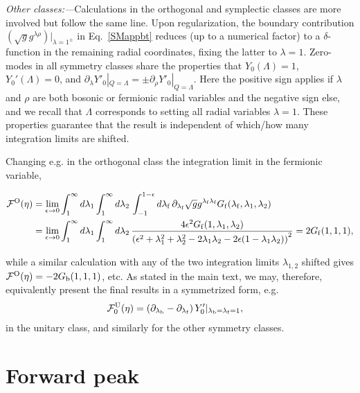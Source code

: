 \documentclass[twocolumn,showpacs,aps,prl]{revtex4}
\begin{document}
{\it Other classes:---}Calculations in the orthogonal and symplectic classes are more involved but follow 
the same line. Upon regularization, the boundary contribution $(\sqrt{g}g^{\lambda\rho})|_{\lambda=1^\pm}$
in Eq.~\eqref{SMappbt} reduces (up to a numerical factor) to a $\delta$-function in the remaining 
radial coordinates, fixing the latter to $\lambda=1$.
Zero-modes in all symmetry classes share the properties that   
$Y_0(\Lambda)=1$, $Y_0'(\Lambda)=0$,  and
$\partial_{\lambda}Y'_0|_{Q=\Lambda}=\pm \partial_{\rho}Y'_0|_{Q=\Lambda}$.
Here the positive sign applies if $\lambda$ and $\rho$ are both bosonic or fermionic
radial variables and the negative sign else, and we recall that $\Lambda$ corresponds  
to setting all radial variables $\lambda=1$.  These 
properties guarantee that the result is independent of which/how many integration limits are shifted.  

Changing e.g. in the orthogonal class 
the integration limit in the fermionic variable,
\begin{widetext}
\begin{align}
{\cal F}^{\rm O}(\eta)
&=
\lim_{\epsilon\to0}
\int_1^\infty d\lambda_1
\int_1^\infty d\lambda_2\,
\int_{-1}^{1-\epsilon} d\lambda_{\rm f}\,
\partial_{\lambda_{\rm f}} \sqrt{g} g^{\lambda_{\rm f} \lambda_{\rm f}} 
G_{\rm f}(\lambda_{\rm f},\lambda_1,\lambda_2)
\nonumber\\
&=
\lim_{\epsilon\to0}
\int_1^\infty d\lambda_1
\int_1^\infty d\lambda_2
\,
{4\epsilon^2 G_{\rm f}(1,\lambda_1,\lambda_2)
\over \left( 
\epsilon^2
+
\lambda_1^2+\lambda_2^2 
-
2\lambda_1\lambda_2
-
2\epsilon(1-\lambda_1\lambda_2)
\right)^2
}
=
2G_{\rm f}(1,1,1),
\end{align}
\end{widetext}
while a similar calculation with any of the two integration limits $\lambda_{1,2}$ shifted 
gives
${\cal F}^{\rm O}(\eta)
=-2G_{\rm b}(1,1,1)$, etc.
As stated in the main text, we may, therefore, equivalently present the final results
in a symmetrized form, e.g.
\begin{align}
{\cal F}^{\rm U}_0(\eta)
&=
\left(
\partial_{\lambda_{\rm b}} 
-
\partial_{\lambda_{\rm f}}
 \right)
Y_0'|_{\lambda_{\rm b}=\lambda_{\rm f}=1},
 \end{align}
in the unitary class, and similarly for the other symmetry classes.







\section{Forward peak}  
\end{document}

